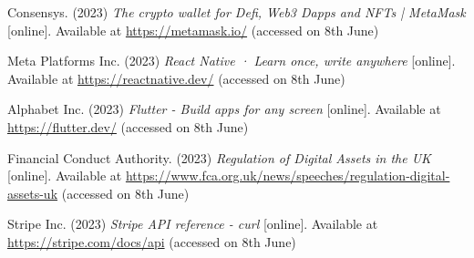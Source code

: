 \noindent [20] Consensys. (2023) \textit{The crypto wallet for Defi, Web3 Dapps and NFTs | MetaMask} [online]. Available at \url{https://metamask.io/} (accessed on 8th June)
\vspace{0.2cm}

\noindent [21] Meta Platforms Inc. (2023) \textit{React Native · Learn once, write anywhere} [online]. Available at \url{https://reactnative.dev/} (accessed on 8th June)
\vspace{0.2cm}

\noindent [22] Alphabet Inc. (2023) \textit{Flutter - Build apps for any screen} [online]. Available at \url{https://flutter.dev/} (accessed on 8th June)
\vspace{0.2cm}

\noindent [23] Financial Conduct Authority. (2023) \textit{Regulation of Digital Assets in the UK} [online]. Available at \url{https://www.fca.org.uk/news/speeches/regulation-digital-assets-uk} (accessed on 8th June)
\vspace{0.2cm}

\noindent [24] Stripe Inc. (2023) \textit{Stripe API reference - curl} [online]. Available at \url{https://stripe.com/docs/api} (accessed on 8th June)
\vspace{0.2cm}

\newpage
